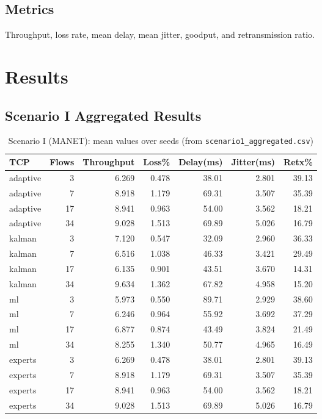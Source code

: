 \documentclass[11pt,a4paper]{article}
\begin{document}
\subsection{Metrics}
Throughput, loss rate, mean delay, mean jitter, goodput, and retransmission ratio.

\section{Results}

\subsection{Scenario I Aggregated Results}
\begin{table}[H]
\centering
\small
\caption{Scenario I (MANET): mean values over seeds (from \texttt{scenario1\_aggregated.csv})}
\begin{tabular}{lrrrrrr}
\toprule
TCP & Flows & Throughput & Loss\% & Delay(ms) & Jitter(ms) & Retx\% \\
\midrule
adaptive & 3  & 6.269 & 0.478 & 38.01 & 2.801 & 39.13 \\
adaptive & 7  & 8.918 & 1.179 & 69.31 & 3.507 & 35.39 \\
adaptive & 17 & 8.941 & 0.963 & 54.00 & 3.562 & 18.21 \\
adaptive & 34 & 9.028 & 1.513 & 69.89 & 5.026 & 16.79 \\
kalman   & 3  & 7.120 & 0.547 & 32.09 & 2.960 & 36.33 \\
kalman   & 7  & 6.516 & 1.038 & 46.33 & 3.421 & 29.49 \\
kalman   & 17 & 6.135 & 0.901 & 43.51 & 3.670 & 14.31 \\
kalman   & 34 & 9.634 & 1.362 & 67.82 & 4.958 & 15.20 \\
ml       & 3  & 5.973 & 0.550 & 89.71 & 2.929 & 38.60 \\
ml       & 7  & 6.246 & 0.964 & 55.92 & 3.692 & 37.29 \\
ml       & 17 & 6.877 & 0.874 & 43.49 & 3.824 & 21.49 \\
ml       & 34 & 8.255 & 1.340 & 50.77 & 4.965 & 16.49 \\
experts  & 3  & 6.269 & 0.478 & 38.01 & 2.801 & 39.13 \\
experts  & 7  & 8.918 & 1.179 & 69.31 & 3.507 & 35.39 \\
experts  & 17 & 8.941 & 0.963 & 54.00 & 3.562 & 18.21 \\
experts  & 34 & 9.028 & 1.513 & 69.89 & 5.026 & 16.79 \\

\end{tabular}
\end{table}
\end{document}
